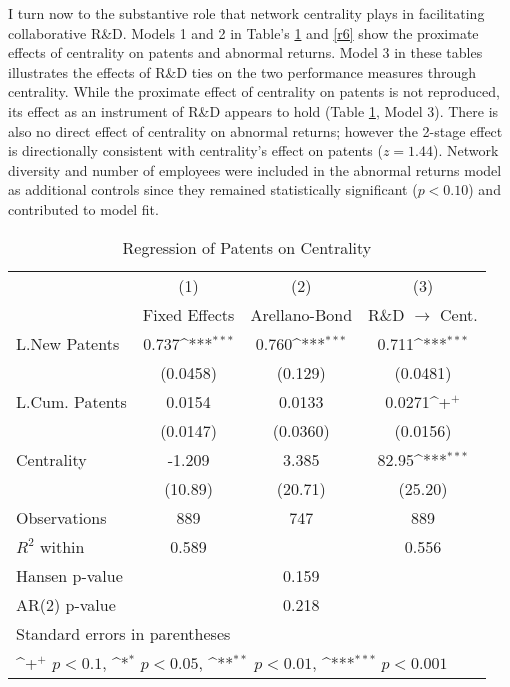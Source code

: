 I turn now to the substantive role that network centrality plays in facilitating collaborative R\&D. Models 1 and 2 in Table's \ref{r5} and \ref{r6} show the proximate effects of centrality on patents and abnormal returns. Model 3 in these tables illustrates the effects of R\&D ties on the two performance measures through centrality. While the proximate effect of centrality on patents is not reproduced, its effect as an instrument of R\&D appears to hold (Table \ref{r5}, Model 3). There is also no direct effect of centrality on abnormal returns; however the 2-stage effect is directionally consistent with centrality's effect on patents ($z=1.44$). Network diversity and number of employees were included in the abnormal returns model as additional controls since they remained statistically significant ($p < 0.10$) and contributed to model fit.

\begin{table}[htbp]\centering \caption{Regression of Patents on Centrality \label{r5}}
{
\def\sym#1{\ifmmode^{#1}\else\(^{#1}\)\fi}
\begin{tabular}{l*{3}{c}}
\hline\hline
                    &\multicolumn{1}{c}{(1)}&\multicolumn{1}{c}{(2)}&\multicolumn{1}{c}{(3)}\\
                    &\multicolumn{1}{c}{Fixed Effects}&\multicolumn{1}{c}{Arellano-Bond}&\multicolumn{1}{c}{R\&D $\rightarrow$ Cent.}\\
\hline
L.New Patents       &       0.737\sym{***}&       0.760\sym{***}&       0.711\sym{***}\\
                    &    (0.0458)         &     (0.129)         &    (0.0481)         \\
L.Cum. Patents      &      0.0154         &      0.0133         &      0.0271\sym{+}  \\
                    &    (0.0147)         &    (0.0360)         &    (0.0156)         \\
Centrality          &      -1.209         &       3.385         &       82.95\sym{***}\\
                    &     (10.89)         &     (20.71)         &     (25.20)         \\
\hline
Observations        &         889         &         747         &         889         \\
$R^2$ within                &       0.589         &                     &       0.556         \\
Hansen p-value             &                     &       0.159         &                     \\
AR(2) p-value                &                     &       0.218         &                     \\
\hline\hline
\multicolumn{4}{l}{\footnotesize Standard errors in parentheses}\\
\multicolumn{4}{l}{\footnotesize \sym{+} \(p<0.1\), \sym{*} \(p<0.05\), \sym{**} \(p<0.01\), \sym{***} \(p<0.001\)}\\
\end{tabular}
}
\end{table}

